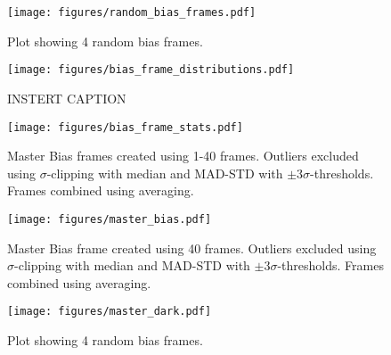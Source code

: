 \documentclass{aastex631}
\begin{document}
\begin{figure}[ht!]
    \begin{centering}
        \texttt{[image: figures/random\_bias\_frames.pdf]}
        \caption{
            Plot showing 4 random bias frames.
        }
        \label{fig:random_bias}
    \end{centering}
\end{figure}

\begin{figure}[ht!]
    \begin{centering}
        \texttt{[image: figures/bias\_frame\_distributions.pdf]}
        \caption{
            INSTERT CAPTION
        }
        \label{fig:bias_frame_distributions}
    \end{centering}
\end{figure}

\begin{figure}[ht!]
    \begin{centering}
        \texttt{[image: figures/bias\_frame\_stats.pdf]}
        \caption{
            Master Bias frames created using 1-40 frames. Outliers excluded using $\sigma$-clipping with median and MAD-STD with $\pm3\sigma$-thresholds. Frames combined using averaging.
        }
        \label{fig:bias_frame_stats}
    \end{centering}
\end{figure}

\begin{figure}[ht!]
    \begin{centering}
        \texttt{[image: figures/master\_bias.pdf]}
        \caption{
            Master Bias frame created using 40 frames. Outliers excluded using $\sigma$-clipping with median and MAD-STD with $\pm3\sigma$-thresholds. Frames combined using averaging.
        }
        \label{fig:master_bias}
    \end{centering}
\end{figure}

\begin{figure}[ht!]
    \begin{centering}
        \texttt{[image: figures/master\_dark.pdf]}
        \caption{
            Plot showing 4 random bias frames.
        }
        \label{fig:master_dark}
    \end{centering}
\end{figure}
\end{document}
